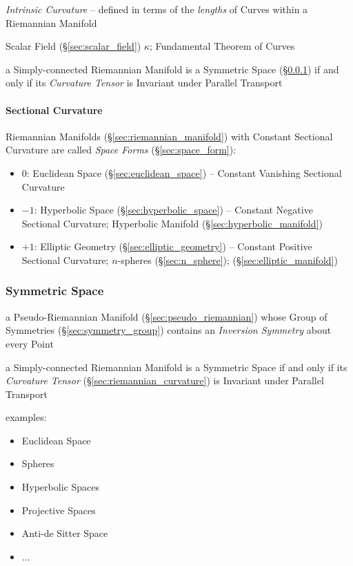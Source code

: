\emph{Intrinsic Curvature} -- defined in terms of the \emph{lengths} of Curves
within a Riemannian Manifold

Scalar Field (\S\ref{sec:scalar_field}) $\kappa$; Fundamental Theorem of Curves

a Simply-connected Riemannian Manifold is a Symmetric Space
(\S\ref{sec:symmetric_space}) if and only if its \emph{Curvature Tensor} is
Invariant under Parallel Transport



\paragraph{Sectional Curvature}\label{sec:sectional_curvature}\hfill


Riemannian Manifolds (\S\ref{sec:riemannian_manifold}) with Constant Sectional
Curvature are called \emph{Space Forms} (\S\ref{sec:space_form}):
\begin{itemize}
  \item $0$: Euclidean Space (\S\ref{sec:euclidean_space}) -- Constant
    Vanishing Sectional Curvature
  \item $-1$: Hyperbolic Space (\S\ref{sec:hyperbolic_space}) -- Constant
    Negative Sectional Curvature; Hyperbolic Manifold
    (\S\ref{sec:hyperbolic_manifold})
  \item $+1$: Elliptic Geometry (\S\ref{sec:elliptic_geometry}) -- Constant
    Positive Sectional Curvature; $n$-spheres (\S\ref{sec:n_sphere});
    (\S\ref{sec:elliptic_manifold})
\end{itemize}



\subsubsection{Symmetric Space}\label{sec:symmetric_space}

a Pseudo-Riemannian Manifold (\S\ref{sec:pseudo_riemannian}) whose Group of
Symmetries (\S\ref{sec:symmetry_group}) contains an \emph{Inversion Symmetry}
about every Point

a Simply-connected Riemannian Manifold is a Symmetric Space if and only if its
\emph{Curvature Tensor} (\S\ref{sec:riemannian_curvature}) is Invariant under
Parallel Transport

examples:
\begin{itemize}
  \item Euclidean Space
  \item Spheres
  \item Hyperbolic Spaces
  \item Projective Spaces
  \item Anti-de Sitter Space
  \item ...
\end{itemize}



